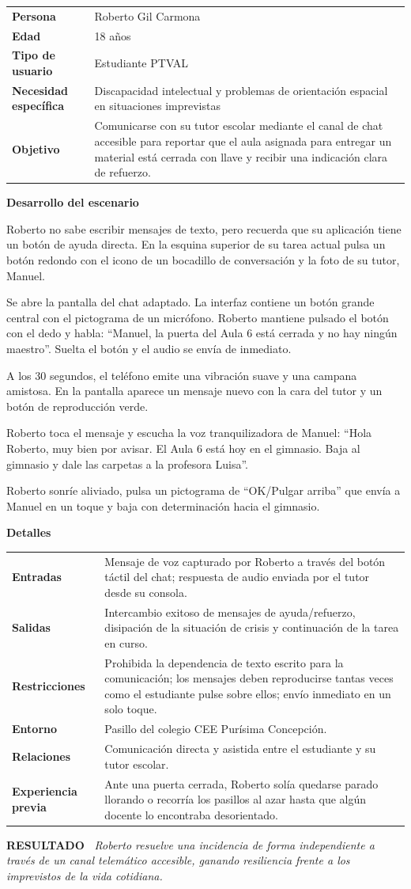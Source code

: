 \documentclass[11pt,a4paper]{article}
\makeatletter
\newcommand{\escenariocard}[6]{%
\needspace{10\baselineskip}
\begin{tcolorbox}[breakable,enhanced,colback=white,colframe=brandgreen,boxrule=0.8pt,arc=3pt,
 left=9pt,right=9pt,top=7pt,bottom=7pt,before skip=10pt,after skip=10pt,
 title={\textbf{\color{white}ESCENARIO #1} \\[1pt] {\small\color{tintgreen}#2}},
 colbacktitle=brandgreen,coltitle=white,fonttitle=\bfseries,boxed title style={colframe=brandgreen}]
{\setlength{\parskip}{0pt}\renewcommand{\arraystretch}{1.35}\rowcolors{1}{tintgreen}{white}\arrayrulecolor{white}
\begin{tabular}{@{\hspace{4pt}}>{\bfseries\color{brandgreen}}p{3.4cm}p{11.4cm}@{}}
#3 \\
\end{tabular}}
\vspace{6pt}
\textbf{\color{brandblue}Desarrollo del escenario}\par\vspace{2pt}
#4
\par\vspace{4pt}
\textbf{\color{brandblue}Detalles}\par\vspace{2pt}
{\setlength{\parskip}{0pt}\renewcommand{\arraystretch}{1.35}\rowcolors{1}{tintblue}{white}\arrayrulecolor{white}
\begin{tabular}{@{\hspace{4pt}}>{\bfseries\color{brandblue}}p{3.4cm}p{11.4cm}@{}}
#5 \\
\end{tabular}}
\vspace{6pt}
\begin{tcolorbox}[colback=tintblue,colframe=brandblue,boxrule=0pt,sharp corners,borderline west={3pt}{0pt}{brandblue},left=8pt,right=8pt,top=5pt,bottom=5pt]
\textbf{\small\color{brandblue}RESULTADO\ } {\small\itshape #6}
\end{tcolorbox}
\end{tcolorbox}
}
\makeatother
\begin{document}
\escenariocard{8}{Resolución de un bloqueo en el taller mediante chat accesible con notas de voz}{%
Persona & Roberto Gil Carmona \\
Edad & 18 años \\
Tipo de usuario & Estudiante PTVAL \\
Necesidad específica & Discapacidad intelectual y problemas de orientación espacial en situaciones imprevistas \\
Objetivo & Comunicarse con su tutor escolar mediante el canal de chat accesible para reportar que el aula asignada para entregar un material está cerrada con llave y recibir una indicación clara de refuerzo.
}{%
Roberto no sabe escribir mensajes de texto, pero recuerda que su aplicación tiene un botón de ayuda directa. En la esquina superior de su tarea actual pulsa un botón redondo con el icono de un bocadillo de conversación y la foto de su tutor, Manuel.

Se abre la pantalla del chat adaptado. La interfaz contiene un botón grande central con el pictograma de un micrófono. Roberto mantiene pulsado el botón con el dedo y habla: ``Manuel, la puerta del Aula 6 está cerrada y no hay ningún maestro''. Suelta el botón y el audio se envía de inmediato.

A los 30 segundos, el teléfono emite una vibración suave y una campana amistosa. En la pantalla aparece un mensaje nuevo con la cara del tutor y un botón de reproducción verde.

Roberto toca el mensaje y escucha la voz tranquilizadora de Manuel: ``Hola Roberto, muy bien por avisar. El Aula 6 está hoy en el gimnasio. Baja al gimnasio y dale las carpetas a la profesora Luisa''.

Roberto sonríe aliviado, pulsa un pictograma de ``OK/Pulgar arriba'' que envía a Manuel en un toque y baja con determinación hacia el gimnasio.
}{%
Entradas & Mensaje de voz capturado por Roberto a través del botón táctil del chat; respuesta de audio enviada por el tutor desde su consola. \\
Salidas & Intercambio exitoso de mensajes de ayuda/refuerzo, disipación de la situación de crisis y continuación de la tarea en curso. \\
Restricciones & Prohibida la dependencia de texto escrito para la comunicación; los mensajes deben reproducirse tantas veces como el estudiante pulse sobre ellos; envío inmediato en un solo toque. \\
Entorno & Pasillo del colegio CEE Purísima Concepción. \\
Relaciones & Comunicación directa y asistida entre el estudiante y su tutor escolar. \\
Experiencia previa & Ante una puerta cerrada, Roberto solía quedarse parado llorando o recorría los pasillos al azar hasta que algún docente lo encontraba desorientado.
}{Roberto resuelve una incidencia de forma independiente a través de un canal telemático accesible, ganando resiliencia frente a los imprevistos de la vida cotidiana.}
\end{document}
